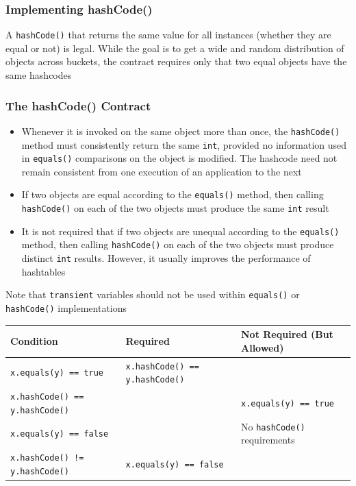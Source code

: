 \subsubsection{Implementing hashCode()}
A \verb#hashCode()# that returns the same value for all instances (whether they 
are equal or not) is legal. While the goal is to get a wide and random 
distribution of objects across buckets, the contract requires only that two 
equal objects have the same hashcodes

\subsubsection{The hashCode() Contract}
\begin{itemize}
    \item Whenever it is invoked on the same object more than once, the 
    \verb#hashCode()# method must consistently return the same \verb#int#, 
    provided no information used in \verb#equals()# comparisons on the object 
    is modified. The hashcode need not remain consistent from one execution of 
    an application to the next
    \item If two objects are equal according to the \verb#equals()# method, 
    then calling \verb#hashCode()# on each of the two objects must produce the 
    same \verb#int# result
    \item It is not required that if two objects are unequal according to the 
    \verb#equals()# method, then calling \verb#hashCode()# on each of the two 
    objects must produce distinct \verb#int# results. However, it usually 
    improves the performance of hashtables
\end{itemize}
Note that \verb#transient# variables should not be used within \verb#equals()# 
or \verb#hashCode()# implementations

\begin{tabular}{lll}
    \textbf{Condition} & \textbf{Required} & \textbf{Not Required (But 
    Allowed)} \\
    \hline
    \verb#x.equals(y) == true# & \verb#x.hashCode() == y.hashCode()# & \\
    \verb#x.hashCode() == y.hashCode()# & & \verb#x.equals(y) == true# \\
    \verb#x.equals(y) == false# & & No \verb#hashCode()# requirements \\
    \verb#x.hashCode() != y.hashCode()# & \verb#x.equals(y) == false# & \\
\end{tabular}

